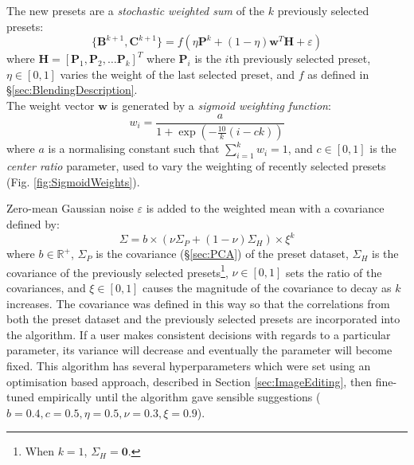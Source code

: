 \documentclass[11pt, oneside]{report}   	%
\renewcommand{\vec}[1]{\mathbf{#1}}
\begin{document}
The new presets are a \emph{stochastic weighted sum} of the $k$ previously selected presets:
\begin{equation}
\{\vec{B}^{k+1}, \vec{C}^{k+1}\} = f(\eta\vec{P}^k + (1-\eta)\vec{w}^T\vec{H} + \varepsilon) 
\end{equation}
where  $\vec{H} = [\vec{P}_1, \vec{P}_2, \dots \vec{P}_k]^T$ where $\vec{P}_i$ is the $i$th previously selected preset, $\eta\in[0, 1]$ varies the weight of the last selected preset, and $f$ as defined in \S \ref{sec:BlendingDescription}.\\
 The weight vector $\vec{w}$ is generated by a \emph{sigmoid weighting function}:
\begin{equation}
	w_i = \frac{a}{1 + \exp\left(-\frac{10}{k}(i-ck)\right)}
\end{equation}
where $a$ is a normalising constant such that $\sum_{i=1}^{k}w_i =1$, and $c\in [0, 1]$ is the \emph{center ratio} parameter, used to vary the weighting of recently selected presets (Fig. \ref{fig:SigmoidWeights}).

Zero-mean Gaussian noise $\varepsilon$ is added to the weighted mean with a covariance defined by:
\begin{equation}
\Sigma = b\times(\nu\Sigma_P + (1-\nu)\Sigma_H)\times\xi^k
\end{equation}
where $b\in\mathbb{R}^+$, $\Sigma_P$ is the covariance (\S \ref{sec:PCA}) of the preset dataset, $\Sigma_H$ is the covariance of the previously selected presets\footnote{When $k =1$, $\Sigma_H = \vec{0}$.}, $\nu \in [0, 1]$ sets the ratio of the covariances, and $\xi \in [0, 1]$ causes the magnitude of the covariance to decay as $k$ increases. The covariance was defined in this way so that the correlations from both the preset dataset and the previously selected presets are incorporated into the algorithm. If a user makes consistent decisions with regards to a particular parameter, its variance will decrease and eventually the parameter will become fixed. This algorithm has several hyperparameters which were set using an optimisation based approach, described in Section \ref{sec:ImageEditing}, then fine-tuned empirically until the algorithm gave sensible suggestions ($b=0.4, c=0.5, \eta=0.5,  \nu=0.3, \xi=0.9$).
\end{document}
